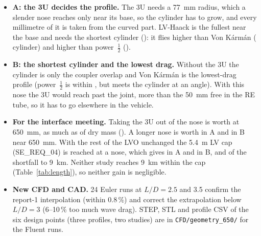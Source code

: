 \begin{itemize}[leftmargin=*,itemsep=2pt]
\item \textbf{A: the 3U decides the profile.} The 3U needs a \SI{77}{mm} radius, which a slender nose
reaches only near its base, so the cylinder has to grow, and every millimetre of it is taken from the
curved part. LV-Haack is the fullest near the base and needs the shortest cylinder
(\TLInLVHC): it flies \TLGAPVK{} higher than Von K\'arm\'an (\TLInVKC{} cylinder) and
\TLGAPPH{} higher than power~$\tfrac12$ (\TLInPHC).
\item \textbf{B: the shortest cylinder and the lowest drag.} Without the 3U the cylinder is only the
\TLCMIN{} coupler overlap and Von K\'arm\'an is the lowest-drag profile (power~$\tfrac12$ is within
\TLEQGAPPH, but meets the cylinder at an angle). With this nose the 3U would reach \TLOutVKP{} past
the joint, more than the \SI{50}{mm} free in the RE tube, so it has to go elsewhere in the vehicle.
\item \textbf{For the interface meeting.} Taking the 3U out of the nose is worth \TLAB{} at
\SI{650}{mm}, as much as \TLABKG{} of dry mass (\TLDZDM). A longer nose is worth \TLInSLOPE{} in A
and \TLOutSLOPE{} in B near \SI{650}{mm}. With the rest of the LVO unchanged the
\SI{5.4}{m} LV cap (SE\_REQ\_04) is reached at a \TLLVNOSE{} nose, which gives \TLInSEVENTWENTYG{}
in A and \TLOutSEVENTWENTYG{} in B, \TLInSHARE{} and \TLOutSHARE{} of the shortfall to \SI{9}{km}.
Neither study reaches \SI{9}{km} within the cap (Table~\ref{tab:length}), so neither gain is
negligible.
\item \textbf{New CFD and CAD.} 24 Euler runs at $L/D = 2.5$ and 3.5 confirm the report-1
interpolation (within 0.8\,\%) and correct the extrapolation below $L/D = 3$ (6--10\,\% too much
wave drag). STEP, STL and profile CSV of the six design points (three profiles, two studies) are in
\texttt{CFD/geometry\_650/} for the Fluent runs.
\end{itemize}

